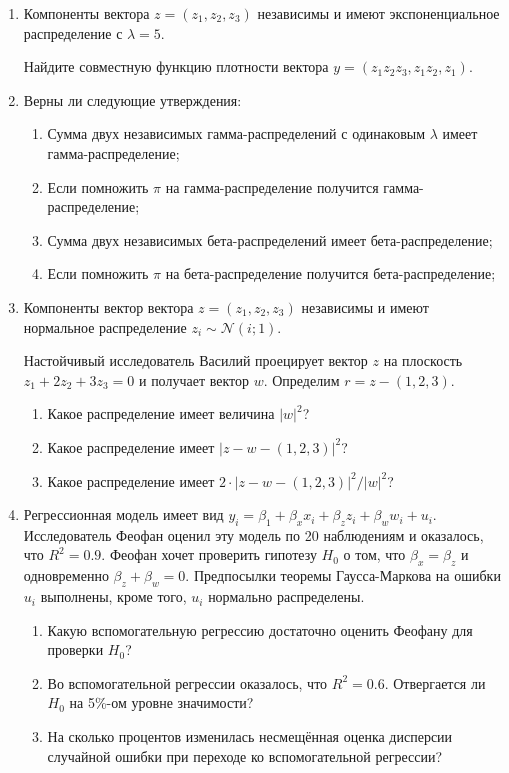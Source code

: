 \documentclass[12pt, a4paper]{article}
\def \cN{\mathcal{N}}
\begin{document}
\begin{enumerate}
\item Компоненты вектора $z= (z_1, z_2, z_3)$ независимы и имеют экспоненциальное распределение с $\lambda = 5$.

Найдите совместную функцию плотности вектора $y = (z_1z_2z_3, z_1z_2, z_1)$.

\item Верны ли следующие утверждения:

\begin{enumerate}
  \item Сумма двух независимых гамма-распределений с одинаковым $\lambda$ имеет гамма-распределение;
  \item Если помножить $\pi$ на гамма-распределение получится гамма-распределение;
  \item Сумма двух независимых бета-распределений  имеет бета-распределение;
  \item Если помножить $\pi$ на бета-распределение получится бета-распределение;
\end{enumerate}

\item Компоненты вектор вектора $z= (z_1, z_2, z_3)$ независимы и имеют нормальное распределение $z_i \sim \cN(i; 1)$.

Настойчивый исследователь Василий проецирует вектор $z$ на плоскость $z_1 + 2z_2 +3z_3 =0$ и получает вектор $w$. Определим $r = z - (1, 2, 3)$.

\begin{enumerate}
  \item Какое распределение имеет величина $|w|^2$?
  \item Какое распределение имеет $|z - w - (1, 2, 3)|^2$?
  \item Какое распределение имеет $2\cdot |z - w - (1, 2, 3)|^2 / |w|^2$?
\end{enumerate}

\newpage
\item Регрессионная модель имеет вид $y_i= \beta_1+ \beta_x x_{i}+ \beta_z z_{i}+ \beta_w w_{i}+u_i$. Исследователь Феофан оценил эту модель по 20 наблюдениям и оказалось, что $R^2=0.9$. Феофан хочет проверить гипотезу $H_0$ о том, что $\beta_x = \beta_z$ и одновременно $\beta_z + \beta_w = 0$. Предпосылки теоремы Гаусса-Маркова на ошибки $u_i$ выполнены, кроме того, $u_i$ нормально распределены.

\begin{enumerate}
\item Какую вспомогательную регрессию достаточно оценить Феофану для проверки $H_0$?
\item Во вспомогательной регрессии оказалось, что $R^2 = 0.6$. Отвергается ли $H_0$ на 5\%-ом уровне значимости?
\item На сколько процентов изменилась несмещённая оценка дисперсии случайной ошибки при переходе ко вспомогательной регрессии?
\end{enumerate}



\end{enumerate}
\end{document}
